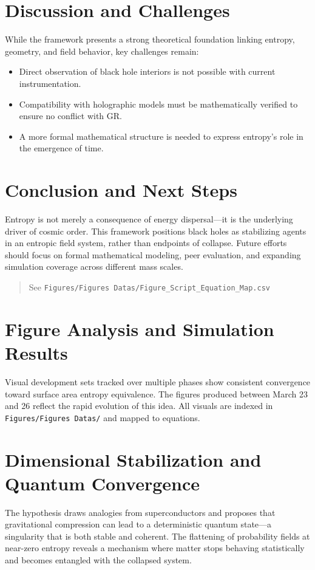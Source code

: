 \documentclass[12pt]{article}
\begin{document}
\section{Discussion and Challenges}
While the framework presents a strong theoretical foundation linking entropy, geometry, and field behavior, key challenges remain:
\begin{itemize}
    \item Direct observation of black hole interiors is not possible with current instrumentation.
    \item Compatibility with holographic models must be mathematically verified to ensure no conflict with GR.
    \item A more formal mathematical structure is needed to express entropy's role in the emergence of time.
\end{itemize}

\section{Conclusion and Next Steps}
Entropy is not merely a consequence of energy dispersal—it is the underlying driver of cosmic order. This framework positions black holes as stabilizing agents in an entropic field system, rather than endpoints of collapse. Future efforts should focus on formal mathematical modeling, peer evaluation, and expanding simulation coverage across different mass scales.


\begin{quote}
See \texttt{Figures/Figures~Datas/Figure\_Script\_Equation\_Map.csv}
\end{quote}

\section{Figure Analysis and Simulation Results}
Visual development sets tracked over multiple phases show consistent convergence toward surface area entropy equivalence. The figures produced between March 23 and 26 reflect the rapid evolution of this idea. All visuals are indexed in \texttt{Figures/Figures Datas/} and mapped to equations.

\section{Dimensional Stabilization and Quantum Convergence}
The hypothesis draws analogies from superconductors and proposes that gravitational compression can lead to a deterministic quantum state—a singularity that is both stable and coherent. The flattening of probability fields at near-zero entropy reveals a mechanism where matter stops behaving statistically and becomes entangled with the collapsed system.
\end{document}
